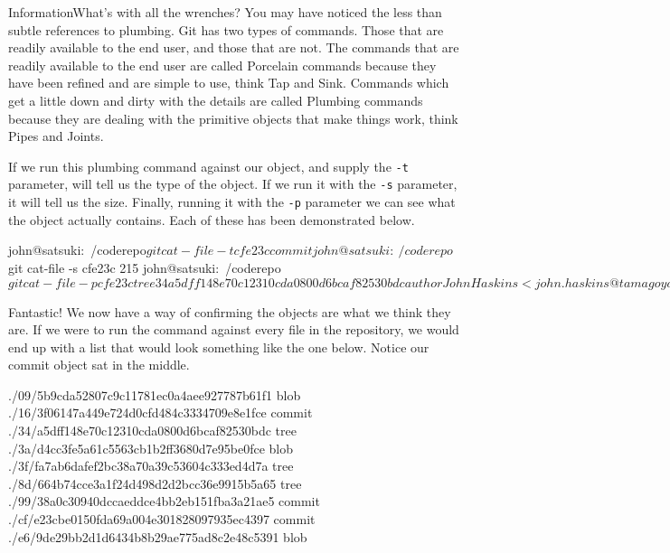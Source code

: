 \begin{callout}{Information}{What's with all the wrenches?}
You may have noticed the less than subtle references to plumbing.
Git has two types of commands.
Those that are readily available to the end user, and those that are not.
\newline
The commands that are readily available to the end user are called Porcelain commands because they have been refined and are simple to use, think Tap and Sink.
\newline
Commands which get a little down and dirty with the details are called Plumbing commands because they are dealing with the primitive objects that make things work, think Pipes and Joints.
\end{callout}

If we run this plumbing command against our object, and supply the \texttt{-t} parameter,  will tell us the type of the object.
If we run it with the \texttt{-s} parameter, it will tell us the size.
Finally, running it with the \texttt{-p} parameter we can see what the object actually contains.
Each of these has been demonstrated below.

\begin{code}
john@satsuki:~/coderepo$ git cat-file -t cfe23c
commit
john@satsuki:~/coderepo$ git cat-file -s cfe23c
215
john@satsuki:~/coderepo$ git cat-file -p cfe23c
tree 34a5dff148e70c12310cda0800d6bcaf82530bdc
author John Haskins <john.haskins@tamagoyakiinc.koala> 1301599664 +0100
committer John Haskins <john.haskins@tamagoyakiinc.koala> 1301599664 +0100

My First Ever Commit
john@satsuki:~/coderepo$
\end{code}

Fantastic! We now have a way of confirming the objects are what we think they are.
If we were to run the command against every file in the repository, we would end up with a list that would look something like the one below.
Notice our commit object sat in the middle.

\begin{code}
./09/5b9cda52807c9c11781ec0a4aee927787b61f1     blob
./16/3f06147a449e724d0cfd484c3334709e8e1fce     commit
./34/a5dff148e70c12310cda0800d6bcaf82530bdc     tree
./3a/d4cc3fe5a61c5563cb1b2ff3680d7e95be0fce     blob
./3f/fa7ab6dafef2bc38a70a39c53604c333ed4d7a     tree
./8d/664b74cce3a1f24d498d2d2bcc36e9915b5a65     tree
./99/38a0c30940dccaeddce4bb2eb151fba3a21ae5     commit
./cf/e23cbe0150fda69a004e301828097935ec4397     commit
./e6/9de29bb2d1d6434b8b29ae775ad8c2e48c5391     blob
\end{code}

